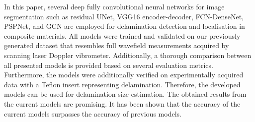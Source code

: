 In this paper, several deep fully convolutional neural networks for image segmentation such as residual UNet, VGG16 encoder-decoder, FCN-DenseNet, PSPNet, and GCN are employed for delamination detection and localisation in composite materials.
All models were trained and validated on our previously generated dataset that resembles full wavefield measurements acquired by scanning laser Doppler vibrometer.
Additionally, a thorough comparison between all presented models is provided based on several evaluation metrics.
Furthermore, the models were additionally verified on experimentally acquired data with a Teflon insert representing delamination.
Therefore, the developed models can be used for delamination size estimation.
The obtained results from the current models are promising.
It has been shown that the accuracy of the current models surpasses the accuracy of previous models. 

